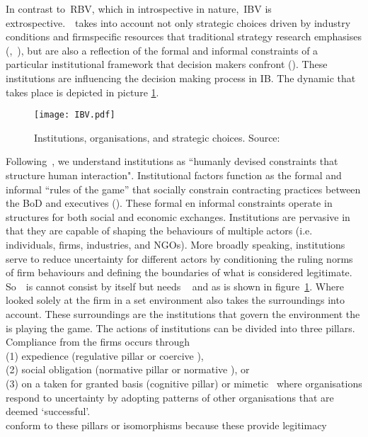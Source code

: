 In contrast to~\gls{RBV}, which in introspective in nature,~\gls{IBV} is extrospective.~\ibv~takes into 
account not only strategic choices driven by industry conditions and firm\-specific resources that 
traditional strategy research emphasises (\cite{Porter:1980},~\cite{Barney:1991}), but are also a 
reflection of the formal and informal constraints of a particular institutional framework that decision
makers confront (\cite{Oliver:1997,Scott:1995}). These institutions are influencing the decision making process in \gls{IB}.  The dynamic that takes place is depicted in picture \ref{fig:ibv}. 

\begin{figure}[htbp!] 
	\centering
	\texttt{[image: IBV.pdf]}
 	\caption{Institutions, organisations, and strategic choices.
Source: \cite{Peng:2000}}
	\label{fig:ibv}
\end{figure}



Following~\cite{North:1990}, we understand institutions as ``humanly devised constraints
that structure human interaction". Institutional factors function as the formal and
informal ``rules of the game'' that socially constrain contracting practices between the \gls{BoD} and 
executives (\cite{North:1990}).  
These formal en informal constraints operate in structures for both social and economic exchanges. 
Institutions are pervasive in that they are capable of shaping the behaviours of multiple actors (i.e. 
individuals, firms, industries, and \glspl{NGO}). More broadly speaking, institutions serve to reduce 
uncertainty for different actors by conditioning the ruling norms of firm behaviours and defining the 
boundaries of what is considered legitimate.~\cite{Peng:2008}\\

So~\ibv~is cannot consist by itself but needs \rbv~\cite{Barney:1991} and \cite{Porter:1980} as is shown in figure~\ref{fig:ibv}. 
Where \rbv looked solely at the firm in a set environment \ibv also takes the surroundings into account. These surroundings are the institutions that govern the environment the \mne is playing the game. 
The actions of institutions can be divided into three pillars. Compliance from the firms occurs through \\(1) expedience (regulative pillar or coercive \iso),\\
 (2) social obligation (normative pillar or normative \iso), or \\
 (3) on a taken for granted basis (cognitive pillar) or mimetic \iso~where organisations respond to uncertainty by adopting patterns of other organisations that are deemed `successful'\cite{Westney:2005,Peng:2008,Kostova:1999,DiMaggio:1983,Scott:1995}.\\ 
\mne conform to these pillars or isomorphisms because these provide legitimacy~\cite{Powell:1991}

